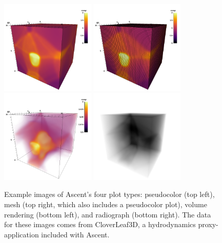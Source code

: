 \begin{figure}
\centering
  \includegraphics[width=0.4\textwidth]{images/pseudocolor250}
  \includegraphics[width=0.4\textwidth]{images/mesh250}
  \includegraphics[width=0.4\textwidth]{images/volume250}
  \includegraphics[width=0.4\textwidth]{images/radiograph250}
  \caption{\label{fig:ascent_plots} Example images of Ascent's four plot types:
pseudocolor (top left), mesh (top right, which also includes a pseudocolor plot),
volume rendering (bottom left), and radiograph (bottom right).
%
The data for these images comes from CloverLeaf3D, 
a hydrodynamics proxy-application included with Ascent.
  }
\end{figure}

